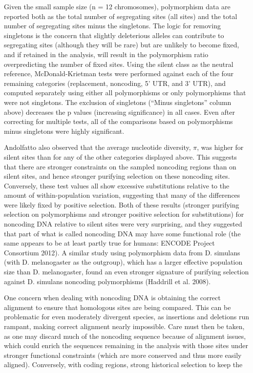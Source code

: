 \documentclass{article}
\begin{document}
Given the small sample size (n = 12 chromosomes), polymorphism data are reported both as the total number of segregating sites (all sites) and the total number of segregating sites minus the singletons. The logic for removing singletons is the concern that slightly deleterious alleles can contribute to segregating sites (although they will be rare) but are unlikely to become fixed, and if retained in the analysis, will result in the polymorphism ratio overpredicting the number of fixed sites. Using the silent class as the neutral reference, McDonald-Krietman tests were performed against each of the four remaining categories (replacement, noncoding, 5' UTR, and 3' UTR), and computed separately using either all polymorphisms or only polymorphisms that were not singletons. The exclusion of singletons (“Minus singletons” column above) decreases the p values (increasing significance) in all cases. Even after correcting for multiple tests, all of the comparisons based on polymorphisms minus singletons were highly significant.

Andolfatto also observed that the average nucleotide diversity,  $ \pi $, was higher for silent sites than for any of the other categories displayed above. This suggests that there are stronger constraints on the sampled noncoding regions than on silent sites, and hence stronger purifying selection on these noncoding sites. Conversely, these test values all show excessive substitutions relative to the amount of within-population variation, suggesting that many of the differences were likely fixed by positive selection. Both of these results (stronger purifying selection on polymorphisms and stronger positive selection for substitutions) for noncoding DNA relative to silent sites were very surprising, and they suggested that part of what is called noncoding DNA may have some functional role (the same appears to be at least partly true for humans: ENCODE Project Consortium 2012). A similar study using polymorphism data from D. simulans (with D. melanogaster as the outgroup), which has a larger effective population size than D. melanogaster, found an even stronger signature of purifying selection against D. simulans noncoding polymorphisms (Haddrill et al. 2008).

One concern when dealing with noncoding DNA is obtaining the correct alignment to ensure that homologous sites are being compared. This can be problematic for even moderately divergent species, as insertions and deletions run rampant, making correct alignment nearly impossible. Care must then be taken, as one may discard much of the noncoding sequence because of alignment issues, which could enrich the sequences remaining in the analysis with those sites under stronger functional constraints (which are more conserved and thus more easily aligned). Conversely, with coding regions, strong historical selection to keep the
\end{document}
